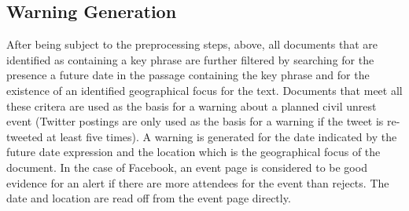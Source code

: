 %

%
\subsection{Warning Generation}
After being subject to the preprocessing steps, above, all documents
that are identified as containing a key phrase are further filtered by
searching for the presence a future date in the passage containing the
key phrase and for the existence of an identified geographical focus for the text.
Documents that meet all these critera are used as the basis for a warning about a
planned civil unrest event (Twitter postings are only used as the basis for a warning
if the tweet is re-tweeted at least five times). 
A warning is generated for the date indicated by the future date
expression and the location which is the geographical focus of the
document.  
In the case of Facebook, an event page is considered to be good evidence for an alert if
there are more attendees for the event than rejects.  The date and
location are read off from the event page directly.
